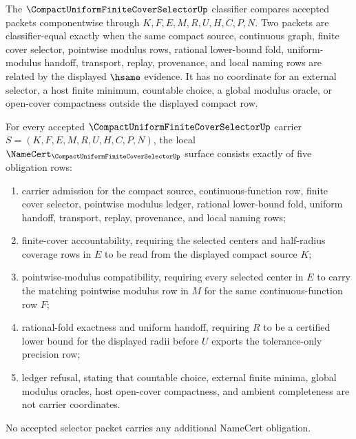 \begin{definition}
\label{def:compact-uniform-finite-cover-selector-classifier}
The $\CompactUniformFiniteCoverSelectorUp$ classifier compares accepted packets componentwise through $K,F,E,M,R,U,H,C,P,N$. Two packets are classifier-equal exactly when the same compact source, continuous graph, finite cover selector, pointwise modulus rows, rational lower-bound fold, uniform-modulus handoff, transport, replay, provenance, and local naming rows are related by the displayed $\hsame$ evidence. It has no coordinate for an external selector, a host finite minimum, countable choice, a global modulus oracle, or open-cover compactness outside the displayed compact row.
\end{definition}

\begin{theorem}
\label{thm:compact-uniform-finite-cover-selector-obligations}
For every accepted $\CompactUniformFiniteCoverSelectorUp$ carrier $S=(K,F,E,M,R,U,H,C,P,N)$, the local $\NameCert_{\CompactUniformFiniteCoverSelectorUp}$ surface consists exactly of five obligation rows:
\begin{enumerate}
\item carrier admission for the compact source, continuous-function row, finite cover selector, pointwise modulus ledger, rational lower-bound fold, uniform handoff, transport, replay, provenance, and local naming rows;
\item finite-cover accountability, requiring the selected centers and half-radius coverage rows in $E$ to be read from the displayed compact source $K$;
\item pointwise-modulus compatibility, requiring every selected center in $E$ to carry the matching pointwise modulus row in $M$ for the same continuous-function row $F$;
\item rational-fold exactness and uniform handoff, requiring $R$ to be a certified lower bound for the displayed radii before $U$ exports the tolerance-only precision row;
\item ledger refusal, stating that countable choice, external finite minima, global modulus oracles, host open-cover compactness, and ambient completeness are not carrier coordinates.
\end{enumerate}
No accepted selector packet carries any additional NameCert obligation.
\end{theorem}
